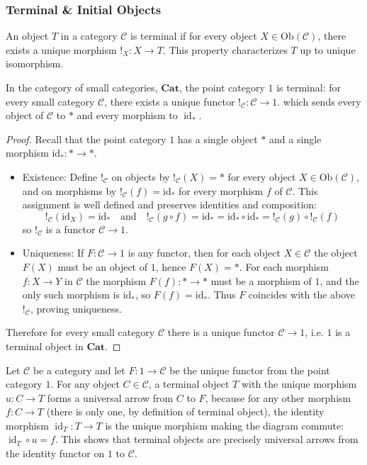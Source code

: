 \subsubsection{\centering Terminal \& Initial Objects}
\begin{definition}
  An object $T$ in a category $\mathcal{C}$ is terminal if for every object 
  $X \in \text{Ob}(\mathcal{C})$, there exists a unique morphism
  \(
    !_X : X \to T
    \).
  This property characterizes $T$ up to unique isomorphism.
\begin{proposition}
  In the category of small categories, $\mathbf{Cat}$, the point category $1$ is terminal:
  for every small category $\mathcal{C}$, there exists a unique functor
  \(
    !_\mathcal{C} : \mathcal{C} \to 1
  \). which sends every object of $\mathcal{C}$ to $*$ and every morphism to $\operatorname{id}_*$.
\end{proposition}

\begin{proof}
Recall that the point category $1$ has a single object $*$ and a single morphism $\mathrm{id}_*:* \to *$.
\begin{itemize}
\item Existence: Define $!_{\mathcal{C}}$ on objects by $!_{\mathcal{C}}(X)=*$ for every object $X\in\mathrm{Ob}(\mathcal{C})$, and on morphisms by $!_{\mathcal{C}}(f)=\mathrm{id}_*$ for every morphism $f$ of $\mathcal{C}$. This assignment is well defined and preserves identities and composition:
\[
!_{\mathcal{C}}(\mathrm{id}_X)=\mathrm{id}_* \quad\text{and}\quad
!_{\mathcal{C}}(g\circ f)=\mathrm{id}_*=\mathrm{id}_*\circ\mathrm{id}_*=!_{\mathcal{C}}(g)\circ !_{\mathcal{C}}(f)
\]
so $!_{\mathcal{C}}$ is a functor $\mathcal{C}\to 1$.

\item Uniqueness: If $F:\mathcal{C}\to 1$ is any functor, then for each object $X\in\mathcal{C}$ the object $F(X)$ must be an object of $1$, hence $F(X)=*$. For each morphism $f:X\to Y$ in $\mathcal{C}$ the morphism $F(f):*\to *$ must be a morphism of $1$, and the only such morphism is $\mathrm{id}_*$, so $F(f)=\mathrm{id}_*$. Thus $F$ coincides with the above $!_{\mathcal{C}}$, proving uniqueness.
\end{itemize}
Therefore for every small category $\mathcal{C}$ there is a unique functor $\mathcal{C}\to 1$, i.e. $1$ is a terminal object in $\mathbf{Cat}$.
\end{proof}

\begin{example}
  Let $\mathcal{C}$ be a category and let $F : 1 \to \mathcal{C}$ be the unique functor from the point category $1$. 
  For any object $C \in \mathcal{C}$, a terminal object $T$ with the unique morphism 
  $u : C \to T$ forms a universal arrow from $C$ to $F$, because for any other morphism 
  $f : C \to T$ (there is only one, by definition of terminal object), the identity 
  morphism $\operatorname{id}_T : T \to T$ is the unique morphism making the diagram commute:
  \(
    \operatorname{id}_T \circ u = f
  \).
  This shows that terminal objects are precisely universal arrows from the identity functor on $1$ to $\mathcal{C}$.
\end{example}

\end{definition}
